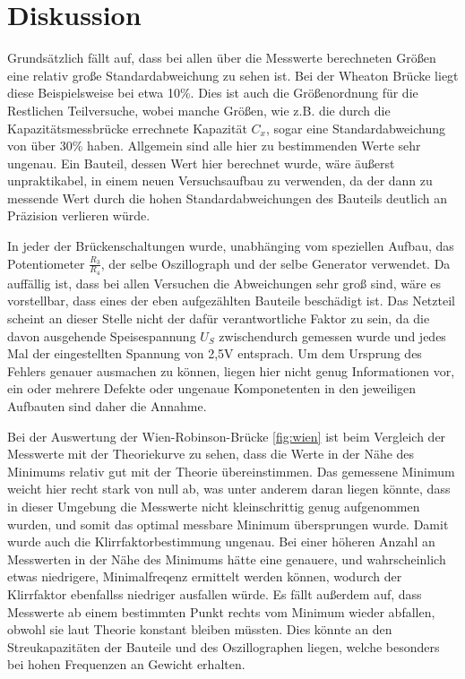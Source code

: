 \section{Diskussion}
\label{sec:Diskussion}

Grundsätzlich fällt auf, dass bei allen über die Messwerte berechneten Größen
eine relativ große Standardabweichung zu sehen ist. Bei der Wheaton Brücke liegt diese
Beispielsweise bei etwa 10\%. Dies ist auch die Größenordnung für die Restlichen Teilversuche,
wobei manche Größen, wie z.B. die durch die Kapazitätsmessbrücke errechnete Kapazität $C_x$,
sogar eine Standardabweichung von über 30\% haben. Allgemein sind alle hier zu bestimmenden
Werte sehr ungenau. Ein Bauteil, dessen Wert hier berechnet wurde, wäre äußerst unpraktikabel,
in einem neuen Versuchsaufbau zu verwenden, da der dann zu messende Wert durch die hohen Standardabweichungen
des Bauteils deutlich an Präzision verlieren würde. 

In jeder der Brückenschaltungen wurde, unabhänging vom speziellen Aufbau, das Potentiometer $\frac{R_3}{R_4}$,
der selbe Oszillograph und der selbe Generator verwendet. Da auffällig ist, dass bei allen Versuchen die Abweichungen
sehr groß sind, wäre es vorstellbar, dass eines der eben aufgezählten Bauteile beschädigt ist. Das Netzteil scheint an 
dieser Stelle nicht der dafür verantwortliche Faktor zu sein, da die davon ausgehende Speisespannung $U_S$ zwischendurch 
gemessen wurde und jedes Mal der eingestellten Spannung von 2,5\si{\volt} entsprach. Um dem Ursprung des Fehlers genauer 
ausmachen zu können, liegen hier nicht genug Informationen vor, ein oder mehrere Defekte oder ungenaue Komponetenten in 
den jeweiligen Aufbauten sind daher die Annahme.

Bei der Auswertung der Wien-Robinson-Brücke \ref{fig:wien} ist beim Vergleich der Messwerte mit der Theoriekurve zu sehen,
dass die Werte in der Nähe des Minimums relativ gut mit der Theorie übereinstimmen. Das gemessene Minimum weicht hier recht stark
von null ab, was unter anderem daran liegen könnte, dass in dieser Umgebung die Messwerte nicht kleinschrittig genug aufgenommen 
wurden, und somit das optimal messbare Minimum übersprungen wurde. Damit wurde auch die Klirrfaktorbestimmung ungenau.
Bei einer höheren Anzahl an Messwerten in der Nähe des Minimums hätte eine genauere, und wahrscheinlich etwas niedrigere, Minimalfreqenz
ermittelt werden können, wodurch der Klirrfaktor ebenfallss niedriger ausfallen würde.  Es fällt außerdem auf, dass Messwerte ab einem bestimmten 
Punkt rechts vom Minimum wieder abfallen, obwohl sie laut Theorie konstant bleiben müssten. Dies könnte an den Streukapazitäten der Bauteile und des Oszillographen liegen, 
welche besonders bei hohen Frequenzen an Gewicht erhalten.

